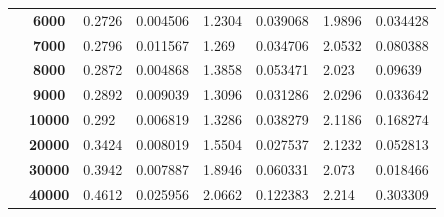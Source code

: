 \documentclass{article}
\begin{document}
\begin{table}[]
\begin{tabular}{|c|c|ll|ll|ll|}
                                           & \textbf{6000}                     & \multicolumn{1}{l|}{0.2726}        & 0.004506                          & \multicolumn{1}{l|}{1.2304}        & 0.039068                          & \multicolumn{1}{l|}{1.9896}        & 0.034428                          \\ \cline{2-8} 
                                           & \textbf{7000}                     & \multicolumn{1}{l|}{0.2796}        & 0.011567                          & \multicolumn{1}{l|}{1.269}         & 0.034706                          & \multicolumn{1}{l|}{2.0532}        & 0.080388                          \\ \cline{2-8} 
                                           & \textbf{8000}                     & \multicolumn{1}{l|}{0.2872}        & 0.004868                          & \multicolumn{1}{l|}{1.3858}        & 0.053471                          & \multicolumn{1}{l|}{2.023}         & 0.09639                           \\ \cline{2-8} 
                                           & \textbf{9000}                     & \multicolumn{1}{l|}{0.2892}        & 0.009039                          & \multicolumn{1}{l|}{1.3096}        & 0.031286                          & \multicolumn{1}{l|}{2.0296}        & 0.033642                          \\ \cline{2-8} 
                                           & \textbf{10000}                    & \multicolumn{1}{l|}{0.292}         & 0.006819                          & \multicolumn{1}{l|}{1.3286}        & 0.038279                          & \multicolumn{1}{l|}{2.1186}        & 0.168274                          \\ \cline{2-8} 
                                           & \textbf{20000}                    & \multicolumn{1}{l|}{0.3424}        & 0.008019                          & \multicolumn{1}{l|}{1.5504}        & 0.027537                          & \multicolumn{1}{l|}{2.1232}        & 0.052813                          \\ \cline{2-8} 
                                           & \textbf{30000}                    & \multicolumn{1}{l|}{0.3942}        & 0.007887                          & \multicolumn{1}{l|}{1.8946}        & 0.060331                          & \multicolumn{1}{l|}{2.073}         & 0.018466                          \\ \cline{2-8} 
                                           & \textbf{40000}                    & \multicolumn{1}{l|}{0.4612}        & 0.025956                          & \multicolumn{1}{l|}{2.0662}        & 0.122383                          & \multicolumn{1}{l|}{2.214}         & 0.303309                          \\ \cline{2-8} 

\end{tabular}
\end{table}
\end{document}
